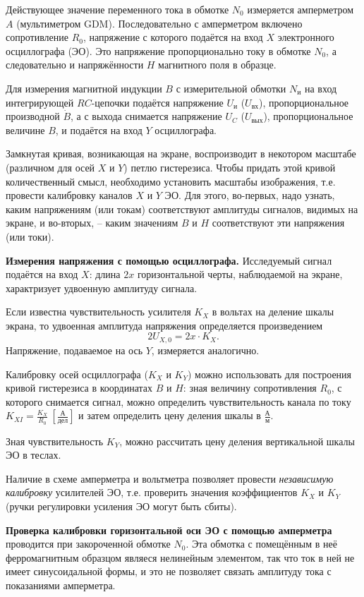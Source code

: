 \documentclass[a4paper,10pt]{article}
\begin{document}
Действующее значение переменного тока в обмотке $N_0$ измеряется амперметром $A$ (мультиметром GDM). Последовательно с амперметром включено сопротивление $R_0$, напряжение с которого подаётся на вход $X$ электронного осциллографа (ЭО). Это напряжение пропорционально току в обмотке $N_0$, а следовательно и напряжённости $H$ магнитного поля в образце.

Для измерения магнитной индукции $B$ с измерительной обмотки $N_{\text{и}}$ на вход интегрирующей $RC$-цепочки подаётся напряжение $U_{\text{и}}$ ($U_{\text{вх}}$), пропорциональное производной $\dot{B}$, а с выхода снимается напряжение $U_C$ ($U_{\text{вых}}$), пропорциональное величине $B$, и подаётся на вход $Y$ осциллографа.

Замкнутая кривая, возникающая на экране, воспроизводит в некотором масштабе (различном для осей $X$ и $Y$) петлю гистерезиса. Чтобы придать этой кривой количественный смысл, необходимо установить масштабы изображения, т.е. провести калибровку каналов $X$ и $Y$ ЭО. Для этого, во-первых, надо узнать, каким напряжениям (или токам) соответствуют амплитуды сигналов, видимых на экране, и во-вторых, -- каким значениям $B$ и $H$ соответствуют эти напряжения (или токи).

\textbf{Измерения напряжения с помощью осциллографа.} Исследуемый сигнал подаётся на вход $X$: длина $2x$ горизонтальной черты, наблюдаемой на экране, характризует удвоенную амплитуду сигнала.

Если известна чувствительность усилителя $K_X$ в вольтах на деление шкалы экрана, то удвоенная амплитуда напряжения определяется произведением\[2U_{X,0}=2x\cdot K_X.\]Напряжение, подаваемое на ось $Y$, измеряется аналогично.

Калибровку осей осциллографа ($K_X$ и $K_Y$) можно использовать для построения кривой гистерезиса в координатах $B$ и $H$: зная величину сопротивления $R_0$, с которого снимается сигнал, можно определить чувствительность канала по току $K_{XI}=\frac{K_X}{R_0}\ \left[\frac{\text{А}}{\text{дел}}\right]$ и затем определить цену деления шкалы в $\frac{\text{А}}{\text{м}}$.

Зная чувствительность $K_Y$, можно рассчитать цену деления вертикальной шкалы ЭО в теслах.

Наличие в схеме амперметра и вольтметра позволяет провести \textit{независимую калибровку} усилителей ЭО, т.е. проверить значения коэффициентов $K_X$ и $K_Y$ (ручки регулировки усиления ЭО могут быть сбиты).

\textbf{Проверка калибровки горизонтальной оси ЭО с помощью амперметра} проводится при закороченной обмотке $N_0$. Эта обмотка с помещённым в неё ферромагнитным образцом являеся нелинейным элементом, так что ток в ней не имеет синусоидальной формы, и это не позволяет связать амплитуду тока с показаниями амперметра.
\end{document}
